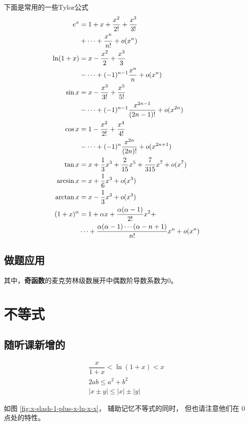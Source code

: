 下面是常用的一些Tylor公式
\begin{align}
	\notag e^x&=1+x+\frac{x^2}{2!}+\frac{x^3}{3!} \\ &+\cdots+\frac{x^n}{n!}+o(x^n)\\
	\notag \ln(1+x)&=x-\frac{x^2}{2}+\frac{x^3}{3}\\ &-\cdots+(-1)^{n-1}\frac{x^n}{n}+o(x^n)\\
	\notag \sin x&=x-\frac{x^3}{3!}+\frac{x^5}{5!}\\ &-\cdots+(-1)^{n-1}\frac{x^{2n-1}}{(2n-1)!}+o(x^{2n})\\
	\notag \cos x&=1-\frac{x^2}{2!}+\frac{x^4}{4!}\\ &-\cdots+(-1)^n\frac{x^{2n}}{(2n)!}+o(x^{2n+1})\\
           \tan x&=x+\frac{1}{3}x^3 + \frac{2}{15}x^5 + \frac{7}{315}x^7 + o(x^7)\\
           \arcsin x&= x + \frac{1}{6} x^3 + o(x^3) \\
           \arctan x&= x - \frac{1}{3} x^3 + o(x^3) \\
	\notag (1+x)^\alpha&=1+\alpha x+\frac{\alpha(\alpha-1)}{2!}x^2+ \\  &\cdots+\frac{\alpha(\alpha-1)\cdots(\alpha-n+1)}{n!}x^n+o(x^n)
\end{align}

\subsection{做题应用} \label{tylor-app}

其中，\textbf{奇函数}的麦克劳林级数展开中偶数阶导数系数为0。

\section{不等式} \label{inequlity}

\subsection{随听课新增的}

\begin{lemma}
    \begin{gather*}
        \dfrac{x}{1+x} < \ln (1+x) < x \\
        2ab \leq a^2 + b^2 \\
        |x\pm y| \leq |x| \pm |y|
    \end{gather*}
\end{lemma}
如图 \ref{fig:x-slash-1-plus-x-ln-x-x}，
辅助记忆不等式的同时，
但也请注意他们在 $0$ 点处的特性。

